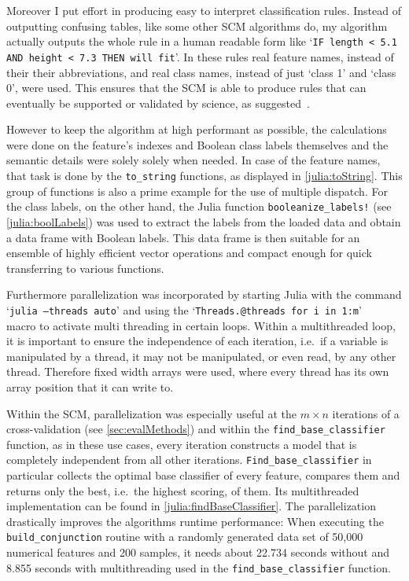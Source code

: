 Moreover I put effort in producing easy to interpret classification rules.
Instead of outputting confusing tables, like some other SCM algorithms do, my algorithm actually outputs
the whole rule in a human readable form like `\texttt{IF length < 5.1 AND height < 7.3 THEN will fit}'.
In these rules real feature names, instead of their their abbreviations, and real class names, instead of just `class 1' and `class 0',
were used.
This ensures that the SCM is able to produce rules that can eventually be supported or validated by science, as suggested~\cite{drouin16}.

However to keep the algorithm at high performant as possible, the calculations were done on the feature's indexes and Boolean class labels themselves and
the semantic details were solely solely when needed.
In case of the feature names, that task is done by the \texttt{to\_string} functions, as displayed in \autoref{julia:toString}.
This group of functions is also a prime example for the use of multiple dispatch.
For the class labels, on the other hand, the Julia function \texttt{booleanize\_labels!} (see \autoref{julia:boolLabels}) was used to extract the labels
from the loaded data and obtain a data frame with Boolean labels.
This data frame is then suitable for an ensemble of highly efficient vector operations and compact enough for quick transferring to various functions.

Furthermore parallelization was incorporated by starting Julia with the command `\texttt{julia --threads auto}'
and using the `\texttt{Threads.@threads for i in 1:m}'\\macro to activate multi threading in certain loops.
Within a multithreaded loop, it is important to ensure the independence of each iteration, i.e.\ if
a variable is manipulated by a thread, it may not be manipulated, or even read, by any other thread.
Therefore fixed width arrays were used, where every thread has its own array position that it can write to.

Within the SCM, parallelization was especially useful at the \(m \times n\) iterations of a cross-validation (see \autoref{sec:evalMethods})
and within the \texttt{find\_base\_classifier} function,
as in these use cases, every iteration constructs a model that is completely independent from all other iterations.
\texttt{Find\_base\_classifier} in particular collects the optimal base classifier of every feature, compares them and returns only the best, i.e.\ the highest scoring, of them.
Its multithreaded implementation can be found in \autoref{julia:findBaseClassifier}.
The parallelization drastically improves the algorithms runtime performance:
When executing the \texttt{build\_conjunction} routine with a randomly generated data set of 50,000 numerical features and 200 samples,
it needs about 22.734 seconds without and 8.855 seconds with multithreading used in the \texttt{find\_base\_classifier} function.